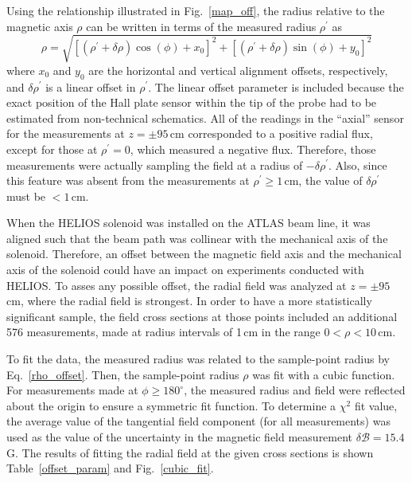 Using the relationship illustrated in Fig.~\ref{map_off}, the radius relative to the magnetic axis $\rho$ can be written in terms of the measured radius $\rho^\prime$ as
\begin{equation}
\rho=\sqrt{[(\rho^\prime + \delta \rho) \cos(\phi)+x_0]^2+[(\rho^\prime + \delta \rho)\sin(\phi)+y_0]^2}
\label{rho_offset}
\end{equation}
where $x_0$ and $y_0$ are the horizontal and vertical alignment offsets, respectively, and $\delta \rho^\prime$ is a linear offset in $\rho^\prime$.  The linear offset parameter is included because the exact position of the Hall plate sensor within the tip of the probe had to be estimated from non-technical schematics.  All of the readings in the ``axial'' sensor for the measurements at $z= \pm 95$\,cm corresponded to a positive radial flux, except for those at $\rho^\prime=0$, which measured a negative flux.  Therefore, those measurements were actually sampling the field at a radius of $-\delta \rho^\prime$.  Also, since this feature was absent from the measurements at $\rho^\prime \geq 1$\,cm, the value of $\delta \rho^\prime$ must be $< 1$\,cm.

When the HELIOS solenoid was installed on the ATLAS beam line, it was aligned such that the beam path was collinear with the mechanical axis of the solenoid.  Therefore, an offset between the magnetic field axis and the mechanical axis of the solenoid could have an impact on experiments conducted with HELIOS.  To asses any possible offset, the radial field was analyzed at $z= \pm 95$\,cm, where the radial field is strongest.  In order to have a more statistically significant sample, %
 the field cross sections at those points included an additional 576 measurements, made at radius intervals of 1\,cm in the range $0<\rho<10$\,cm.  

To fit the data, the measured radius was related to the sample-point radius by Eq.~\ref{rho_offset}.  Then, the sample-point radius $\rho$ was fit with a cubic function.  For measurements made at $\phi \geq 180^\circ$, the measured radius and field were reflected about the origin to ensure a symmetric fit function.  To determine a $\chi^2$ fit value, the average value of the tangential field component (for all measurements) was used as the value of the uncertainty in the magnetic field measurement $\delta \mathscr{B}=15.4$\,G.  The results of fitting the radial field at the given cross sections is shown Table~\ref{offset_param} and Fig.~\ref{cubic_fit}.

